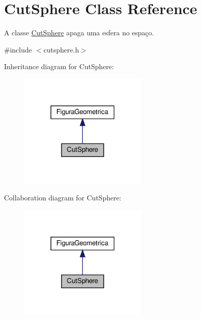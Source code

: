 \hypertarget{class_cut_sphere}{}\section{Cut\+Sphere Class Reference}
\label{class_cut_sphere}


A classe \hyperlink{class_cut_sphere}{Cut\+Sphere} apaga uma esfera no espaço.  




{\ttfamily \#include $<$cutsphere.\+h$>$}



Inheritance diagram for Cut\+Sphere\+:
\nopagebreak
\begin{figure}[H]
\begin{center}
\leavevmode
\includegraphics[width=174pt]{class_cut_sphere__inherit__graph}
\end{center}
\end{figure}


Collaboration diagram for Cut\+Sphere\+:
\nopagebreak
\begin{figure}[H]
\begin{center}
\leavevmode
\includegraphics[width=174pt]{class_cut_sphere__coll__graph}
\end{center}
\end{figure}
